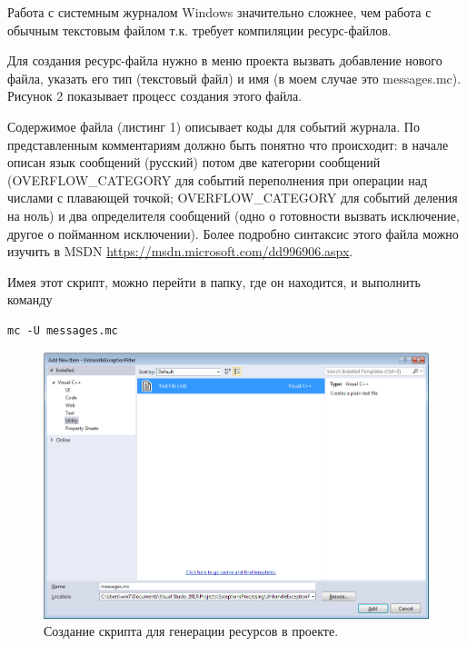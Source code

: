 \documentclass[a4paper, 12pt]{report}		%
\begin{document}
Работа с системным журналом Windows значительно сложнее, чем работа с обычным текстовым файлом т.к. требует компиляции ресурс-файлов.

Для создания ресурс-файла нужно в меню проекта вызвать добавление нового файла, указать его тип (текстовый файл) и имя (в моем случае это messages.mc). Рисунок 2 показывает процесс создания этого файла.

Содержимое файла (листинг 1) описывает коды для событий журнала. По представленным комментариям должно быть понятно что происходит: в начале описан язык сообщений (русский) потом две категории сообщений (OVERFLOW\_CATEGORY для событий переполнения при операции над числами с плавающей точкой; OVERFLOW\_CATEGORY для событий деления на ноль) и два определителя сообщений (одно о готовности вызвать исключение, другое о пойманном исключении). Более подробно синтаксис этого файла можно изучить в MSDN \url{https://msdn.microsoft.com/dd996906.aspx}.



Имея этот скрипт, можно перейти в папку, где он находится, и выполнить команду 

\begin{verbatim}
mc -U messages.mc
\end{verbatim}

\begin{figure}[h!]
\centering
\includegraphics[scale=0.65]{res/message_property0}
\caption{Создание скрипта для генерации ресурсов в проекте.}
\end{figure}
\end{document}
